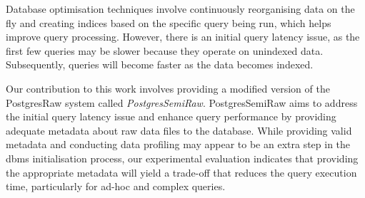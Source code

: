 Database optimisation techniques involve continuously reorganising data on the fly and creating indices based on the specific query being run, which helps improve query processing. However, there is an initial query latency issue, as the first few queries may be slower because they operate on unindexed data. Subsequently, queries will become faster as the data becomes indexed.

Our contribution to this work involves providing a modified version of the PostgresRaw system called \textit{PostgresSemiRaw}. PostgresSemiRaw aims to address the initial query latency issue and enhance query performance by providing adequate metadata about raw data files to the database. While providing valid metadata and conducting data profiling may appear to be an extra step in the \acrshort{dbms} initialisation process, our experimental evaluation indicates that providing the appropriate metadata will yield a trade-off that reduces the query execution time, particularly for ad-hoc and complex queries.

 





